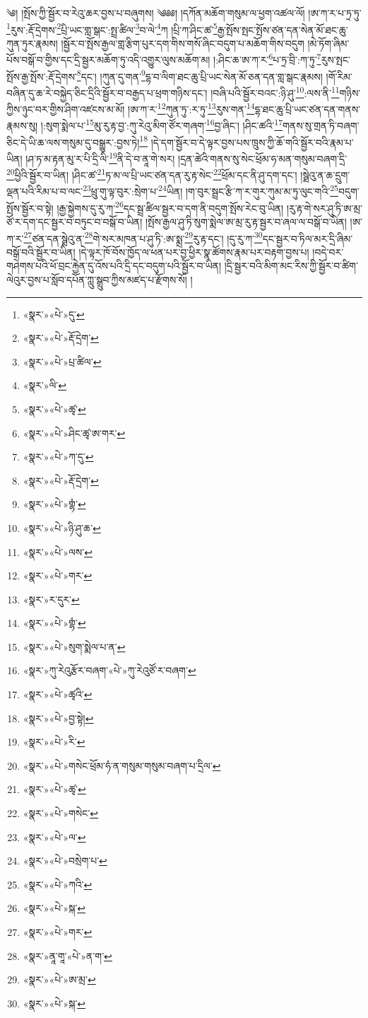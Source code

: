༄། །སྤོས་ཀྱི་སྦྱོར་བ་རེའུ་ཆར་བྱས་པ་བཞུགས། ༄༅༅། །དཀོན་མཆོག་གསུམ་ལ་ཕྱག་འཚལ་ལོ། །ཨ་ཀ་ར་པ་ཏྲ་ཏུ་\footnote{«སྣར་»«པེ་»དུ་}རུས་:རྡོ་དྲེགས་\footnote{«སྣར་»«པེ་»རྡོ་དྲེག་}པྲི་ཡང་གླ་སྒང་:སྤྲ་ཚིལ་\footnote{«སྣར་»«པེ་»པྲ་ཚིལ་}བ་ལེ་\footnote{«སྣར་»ལི་}ཀ །པྲི་ཀ་ཤིང་ཚ་\footnote{«སྣར་»«པེ་»ཚྭ་}རྒྱ་སྤོས་སྤང་སྤོས་ཙན་དན་སེན་མོ་ཐང་ཆུ་ཀུན་ཏུར་རྣམས། །སྦྱོར་བ་སྤོས་རྒྱལ་གླ་རྩིག་པུར་དག་གིས་གསོ་ཞིང་བདུག་པ་མཆོག་གིས་བདུག །མེ་ཏོག་ཞིམ་པོས་བསྒོ་བ་གྱིས་དང་དྲི་སྦྱར་མཆོག་ཏུ་འདི་འགྱུར་ལུས་མཆོག་མ། །:ཤིང་ཆ་ཨ་ཀ་ར་\footnote{«སྣར་»«པེ་»ཤིང་ཚྭ་ཨ་གར་}པ་ཏྲ་བྲི་:ཀ་ཏུ་\footnote{«སྣར་»«པེ་»ཀ་དུ་}རུས་སྤང་སྤོས་རྒྱ་སྤོས་:རྡོ་དྲེགས་\footnote{«སྣར་»«པེ་»རྡོ་དྲེག་}དང་། །ཀུན་དུ་གན་\footnote{«སྣར་»«པེ་»གྷཾ་}དྷ་བ་ལིག་ཐང་ཆུ་པྲི་ཡང་སེན་མོ་ཅན་དན་གླ་སྒང་རྣམས། །གོ་རིམ་བཞིན་དུ་ཆ་རེ་བསྐྱེད་ཅིང་དྲིའི་སྦྱོར་བ་བརྒྱད་པ་ཕྲག་གཉིས་དང་། །བཞི་པའི་སྦྱོར་བའང་:ཉི་ཤུ་\footnote{«སྣར་»«པེ་»ཉི་ཤུ་ཆ་}:ལས་ནི་\footnote{«སྣར་»«པེ་»ལས་}གཉིས་ཀྱིས་ཉུང་བར་གྱིས་ཤིག་འཛངས་མ་མོ། །ཨ་ཀ་ར་\footnote{«སྣར་»«པེ་»གར་}ཀུན་ཏུ་:ར་ཏུ་\footnote{«སྣར་»ར་དུར་}རུས་གན་\footnote{«སྣར་»«པེ་»གྷཾ་}དྷ་ཐང་ཆུ་པྲི་ཡང་ཙན་དན་གནས་རྣམས་སུ། །:སུག་སྨེལ་པ་\footnote{«སྣར་»«པེ་»སུག་སྨེལ་པ་ན་}མུ་རུ་རྟ་བྱ་:ཀུ་རེའུ་མིག་ཙོར་གཞག་\footnote{«སྣར་»ཀུ་རེའུརྩོར་བཞག་«པེ་»ཀུ་རེའུཙོ་ར་བཞག་}བྱ་ཞིང་། །ཤིང་ཚའི་\footnote{«སྣར་»«པེ་»ཚྭའི་}གནས་སུ་གྲན་ཏི་བཞག་ཅིང་དེ་ཡི་ཆ་ལས་གསུམ་དུ་བསྒྱུར་:བྱས་ཏེ།\footnote{«སྣར་»«པེ་»བྱ་སྟེ།} །དེ་དག་སྦྱོར་བ་དེ་ལྟར་བྱས་པས་ཁྲུས་ཀྱི་ཆོ་གའི་སྦྱོར་བའི་རྣམ་པ་ཡིན། །ཤ་ཏ་མ་རྟན་མུ་ར་པི་དྲི་ལི་\footnote{«སྣར་»«པེ་»རི་}ནི་དེ་བ་ནཱ་གེ་སར། །དྲན་ཚེའི་གནས་སུ་སེང་ཕྲོམ་ཧ་མན་གསུམ་བཞག་དྲི་\footnote{«སྣར་»«པེ་»གསེང་ཕྲོམ་ཧཾ་ན་གསུམ་གསུམ་བཞག་པ་དྲིལ་}ཕྱིའི་སྦྱོར་བ་ཡིན། །ཤིང་ཚ་\footnote{«སྣར་»«པེ་»ཚྭ་}ཏ་མ་ལ་པྲི་ཡང་ཙན་དན་རུ་རྟ་སེང་\footnote{«སྣར་»«པེ་»གསེང་}ཕྲོམ་དང་ནི་ཤུ་དག་དང་། །སྠེའུ་ན་ཆ་དྲུག་ལྡན་པའི་རིམ་པ་བ་ལང་\footnote{«སྣར་»«པེ་»ལ་}ཕྲུ་གུ་ལྟ་བུར་:སྲེག་པ་\footnote{«སྣར་»«པེ་»བསྲེག་པ་}ཡིན། །ག་བུར་སྦྲང་རྩི་ཀ་ར་གུར་ཀུམ་མ་ཏུ་ལུང་གའི་\footnote{«སྣར་»«པེ་»ཀའི་}བདུག་སྤོས་སྦྱོར་བ་སྟེ། །རྒྱ་སྐྱེགས་དུ་རུ་ཀ་\footnote{«སྣར་»«པེ་»སྐ་}དང་སྦྲ་ཚིལ་སྦྱར་བ་དག་ནི་བདུག་སྤོས་རེང་བུ་ཡིན། །རུ་རྟ་གེ་སར་ཤུ་ཏི་ཨ་མྲ་ཙོ་ར་དག་དང་སྦྱར་བ་བཏུང་བ་བསྒོ་བ་ཡིན། །སྤོས་རྒྱལ་ཤུ་ཏི་སུག་སྨེལ་ཨ་མྲ་རུ་རྟ་སྦྱར་བ་ཞལ་ལ་བསྒོ་བ་ཡིན། །ཨ་ཀ་ར་\footnote{«སྣར་»«པེ་»གར་}ཙན་དན་སྠེའུ་ན་\footnote{«སྣར་»ནཱ་གཱ་«པེ་»ན་ག་}གེ་སར་མཁན་པ་ཤུ་ཏི་:ཨ་སྨྲ་\footnote{«སྣར་»«པེ་»ཨ་མྲ་}རུ་རྟ་དང་། །དུ་རུ་ཀ་\footnote{«སྣར་»«པེ་»སྐ་}དང་སྦྱར་བ་ཏིལ་མར་དྲི་ཞིམ་བསྒོ་བའི་སྦྱོར་བ་ཡིན། །དེ་ལྟར་ཁོ་བོས་ཁྱོད་ལ་ཕན་པར་བྱ་ཕྱིར་སྣ་ཚོགས་རྣམ་པར་བརྟག་བྱས་པ། །བདེ་བར་གཤེགས་པའི་ཕོ་བྲང་རྐྱེན་དུ་འོས་པའི་དྲི་དང་བདུག་པའི་སྦྱོར་བ་ཡིན། །དྲི་སྦྱར་བའི་མིག་མང་རིས་ཀྱི་སྦྱོར་བ་ཚིག་ལེའུར་བྱས་པ་སློབ་དཔོན་ཀླུ་སྒྲུབ་ཀྱིས་མཛད་པ་རྫོགས་སོ། ། 